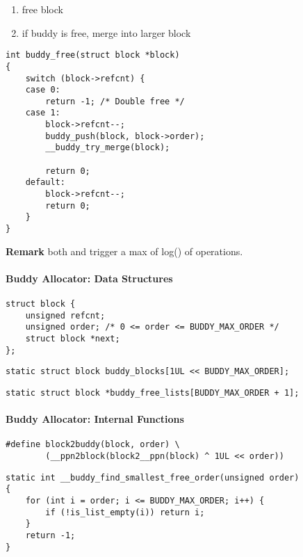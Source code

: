 \newpar{}
\begin{enumerate}
    \item free block
    \item if buddy is free, merge into larger block
\end{enumerate}
\begin{lstlisting}[style=bright_C++]
int buddy_free(struct block *block)
{
    switch (block->refcnt) {
    case 0:
        return -1; /* Double free */
    case 1:
        block->refcnt--;
        buddy_push(block, block->order);
        __buddy_try_merge(block);

        return 0;
    default:
        block->refcnt--;
        return 0;
    }
}
\end{lstlisting}

\textbf{Remark} both  and  trigger a max of log() of operations.

\paragraph{Buddy Allocator: Data Structures}
\begin{lstlisting}[style=bright_C++]
struct block {
    unsigned refcnt;
    unsigned order; /* 0 <= order <= BUDDY_MAX_ORDER */
    struct block *next;
};
\end{lstlisting}
\newpar{}
\begin{lstlisting}[style=bright_C++]
static struct block buddy_blocks[1UL << BUDDY_MAX_ORDER];
\end{lstlisting}

\begin{lstlisting}[style=bright_C++]
static struct block *buddy_free_lists[BUDDY_MAX_ORDER + 1];
\end{lstlisting}

\paragraph{Buddy Allocator: Internal Functions}
\begin{lstlisting}[style=bright_C++]
#define block2buddy(block, order) \
        (__ppn2block(block2__ppn(block) ^ 1UL << order))
\end{lstlisting}

\newpar{}
\begin{lstlisting}[style=bright_C++]
static int __buddy_find_smallest_free_order(unsigned order)
{
    for (int i = order; i <= BUDDY_MAX_ORDER; i++) {
        if (!is_list_empty(i)) return i;
    }
    return -1;
}
\end{lstlisting}

